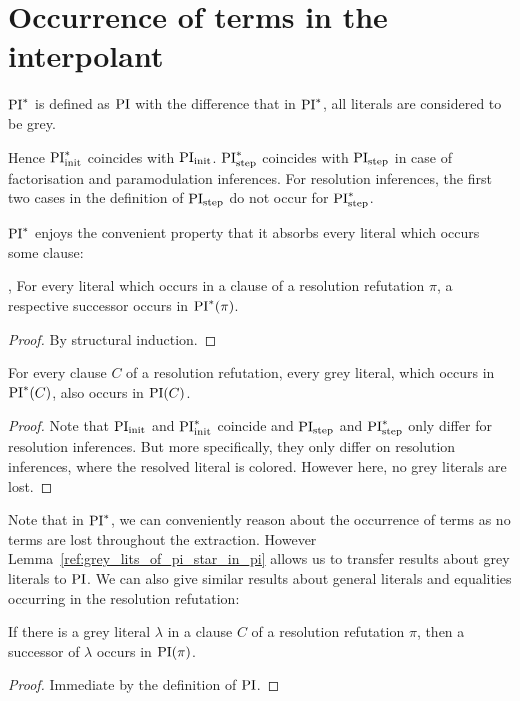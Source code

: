\documentclass[,%
	draft=false,%
	numbers=noendperiod
	12pt,
	a4paper,
	oneside,%
	openany,
]{memoir}
\begin{document}
\section{Occurrence of terms in the interpolant}

\begin{defi}[$\PI^*$]
	$\PI^*$ is defined as $\operatorname{PI}$ with the difference that in $\PI^*$, all literals are considered to be grey.
\end{defi}

Hence $\operatorname{PI}_{\mathrm{init}}^*$ coincides with $\operatorname{PI}_{\mathrm{init}}$.
$\operatorname{PI}_{\mathrm{step}}^*$ coincides with $\operatorname{PI}_{\mathrm{step}}$ in case of factorisation and paramodulation inferences.
For resolution inferences, the first two cases in the definition of $\operatorname{PI}_{\mathrm{step}}$ do not occur for $\operatorname{PI}_{\mathrm{step}}^*$.

$\PI^*$ enjoys the convenient property that it absorbs every literal which occurs some clause:

\begin{prop}
	\label{prop:every_lit_in_pi_star},
	For every literal which occurs in a clause of a resolution refutation $\pi$, a respective successor occurs in $\operatorname{PI}^*(\pi)$.
\end{prop}
\begin{proof}
	By structural induction.
\end{proof}

\begin{lemma}
	\label{lemma:grey_lits_of_pi_star_in_pi}
	For every clause $C$ of a resolution refutation,
	every grey literal, which occurs in $\operatorname{PI}^*(C)$, also occurs in $\operatorname{PI}(C)$.
\end{lemma}
\begin{proof}
	Note that $\operatorname{PI}_{\mathrm{init}}$ and $\operatorname{PI}_{\mathrm{init}}^*$ coincide and $\operatorname{PI}_{\mathrm{step}}$ and $\operatorname{PI}_{\mathrm{step}}^*$ only differ for resolution inferences.
	But more specifically, they only differ on resolution inferences, where the resolved literal is colored. However here, no grey literals are lost.
\end{proof}

Note that in $\PI^*$, we can conveniently reason about the occurrence of terms as no terms are lost throughout the extraction.
However Lemma~\ref{ref:grey_lits_of_pi_star_in_pi} allows us to transfer results about grey literals to $\operatorname{PI}$.
We can also give similar results about general literals and equalities occurring in the resolution refutation:

\begin{lemma}
	\label{lemma:grey_lits_all_in_PI}
	If there is a grey literal $\lambda$ in a clause $C$ of a resolution refutation $\pi$,
	then a successor of $\lambda$ occurs in $\operatorname{PI}(\pi)$.
\end{lemma}
\begin{proof}
	Immediate by the definition of $\operatorname{PI}$.
\end{proof}
\end{document}
